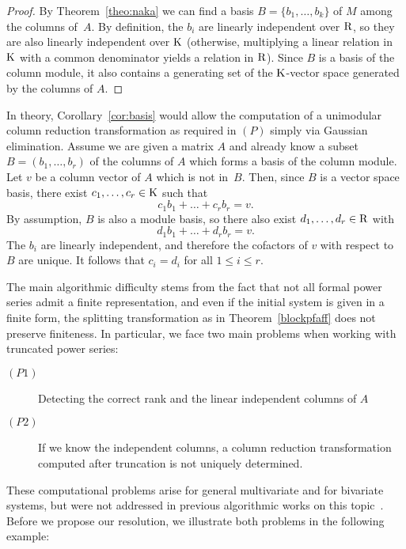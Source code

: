 \documentclass[final,1p,times,number,amsthm]{elsart}
\begin{document}
\begin{proof}
  By Theorem~\ref{theo:naka} we can find a basis $B=\{b_1,\dots,b_k\}$ of $M$
  among the columns of~$A$. By definition, the $b_i$ are linearly independent
  over $\rm R$, so they are also linearly independent over
  $\rm K$ (otherwise, multiplying a linear relation in
  $\rm K$ with a common denominator yields a relation in
  $\rm R$). Since $B$ is a basis of the column module, it also contains a
  generating set of the $\rm K$-vector space generated by
  the columns of $A$.
\end{proof}

In theory, Corollary~\ref{cor:basis} would allow the computation of a unimodular
column reduction transformation as required in $(P)$ simply via Gaussian
elimination. Assume we are given a matrix $A$ and already know a subset
$B=(b_1,\dots,b_r)$ of the columns of $A$ which forms a basis of the column
module.  Let $v$ be a column vector of $A$ which is not in~$B$. Then, since $B$
is a vector space basis, there exist $c_1,\dots,c_r\in {\rm K}$ such that
\[c_1b_1+\dots +c_rb_r=v.\]
By assumption, $B$ is also a module basis, so there also exist
$d_1,\dots,d_r\in {\rm R}$ with
\[d_1b_1+\dots +d_rb_r=v.\]
The $b_i$ are linearly independent, and therefore the cofactors of $v$ with
respect to $B$ are unique. It follows that $c_i=d_i$ for all $1\leq i \leq
r$.


The main algorithmic difficulty stems from the fact that not all formal power
series admit a finite representation, and even if the initial system is given in
a finite form, the splitting transformation as in Theorem~\ref{blockpfaff} does
not preserve finiteness. In particular, we face two main problems when working
with truncated power series:
\begin{description}
\item [$(P1)$] Detecting the correct rank and the linear independent columns of
  $A$
\item [$(P2)$] If we know the independent columns, a column reduction
  transformation computed after truncation is not uniquely determined.
\end{description}
These computational problems arise for general multivariate and for bivariate
systems, but were not addressed in previous algorithmic works on this
topic~\cite{key101,key5,key73}. Before we propose our resolution, we illustrate
both problems in the following example:
\end{document}
